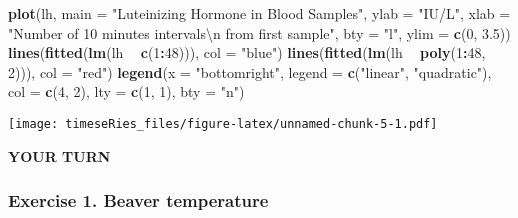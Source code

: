 \documentclass[]{book}
\newenvironment{Shaded}{\begin{snugshade}}{\end{snugshade}}
\newcommand{\KeywordTok}[1]{\textcolor[rgb]{0.13,0.29,0.53}{\textbf{#1}}}
\newcommand{\DataTypeTok}[1]{\textcolor[rgb]{0.13,0.29,0.53}{#1}}
\newcommand{\DecValTok}[1]{\textcolor[rgb]{0.00,0.00,0.81}{#1}}
\newcommand{\FloatTok}[1]{\textcolor[rgb]{0.00,0.00,0.81}{#1}}
\newcommand{\CharTok}[1]{\textcolor[rgb]{0.31,0.60,0.02}{#1}}
\newcommand{\StringTok}[1]{\textcolor[rgb]{0.31,0.60,0.02}{#1}}
\newcommand{\OperatorTok}[1]{\textcolor[rgb]{0.81,0.36,0.00}{\textbf{#1}}}
\newcommand{\NormalTok}[1]{#1}
\begin{document}
\begin{Shaded}
\begin{Highlighting}[]
\KeywordTok{plot}\NormalTok{(lh, }\DataTypeTok{main =} \StringTok{"Luteinizing Hormone in Blood Samples"}\NormalTok{, }\DataTypeTok{ylab =} \StringTok{"IU/L"}\NormalTok{, }\DataTypeTok{xlab =} \StringTok{"Number of 10 minutes intervals}\CharTok{\textbackslash{}n}\StringTok{ from first sample"}\NormalTok{, }
    \DataTypeTok{bty =} \StringTok{"l"}\NormalTok{, }\DataTypeTok{ylim =} \KeywordTok{c}\NormalTok{(}\DecValTok{0}\NormalTok{, }\FloatTok{3.5}\NormalTok{))}
\KeywordTok{lines}\NormalTok{(}\KeywordTok{fitted}\NormalTok{(}\KeywordTok{lm}\NormalTok{(lh }\OperatorTok{~}\StringTok{ }\KeywordTok{c}\NormalTok{(}\DecValTok{1}\OperatorTok{:}\DecValTok{48}\NormalTok{))), }\DataTypeTok{col =} \StringTok{"blue"}\NormalTok{)}
\KeywordTok{lines}\NormalTok{(}\KeywordTok{fitted}\NormalTok{(}\KeywordTok{lm}\NormalTok{(lh }\OperatorTok{~}\StringTok{ }\KeywordTok{poly}\NormalTok{(}\DecValTok{1}\OperatorTok{:}\DecValTok{48}\NormalTok{, }\DecValTok{2}\NormalTok{))), }\DataTypeTok{col =} \StringTok{"red"}\NormalTok{)}
\KeywordTok{legend}\NormalTok{(}\DataTypeTok{x =} \StringTok{"bottomright"}\NormalTok{, }\DataTypeTok{legend =} \KeywordTok{c}\NormalTok{(}\StringTok{"linear"}\NormalTok{, }\StringTok{"quadratic"}\NormalTok{), }\DataTypeTok{col =} \KeywordTok{c}\NormalTok{(}\DecValTok{4}\NormalTok{, }\DecValTok{2}\NormalTok{), }
    \DataTypeTok{lty =} \KeywordTok{c}\NormalTok{(}\DecValTok{1}\NormalTok{, }\DecValTok{1}\NormalTok{), }\DataTypeTok{bty =} \StringTok{"n"}\NormalTok{)}
\end{Highlighting}
\end{Shaded}

\texttt{[image: timeseRies\_files/figure-latex/unnamed-chunk-5-1.pdf]}

\textbf{YOUR TURN}

\subsubsection{Exercise 1. Beaver
temperature}\label{exercise-1.-beaver-temperature}
\end{document}
